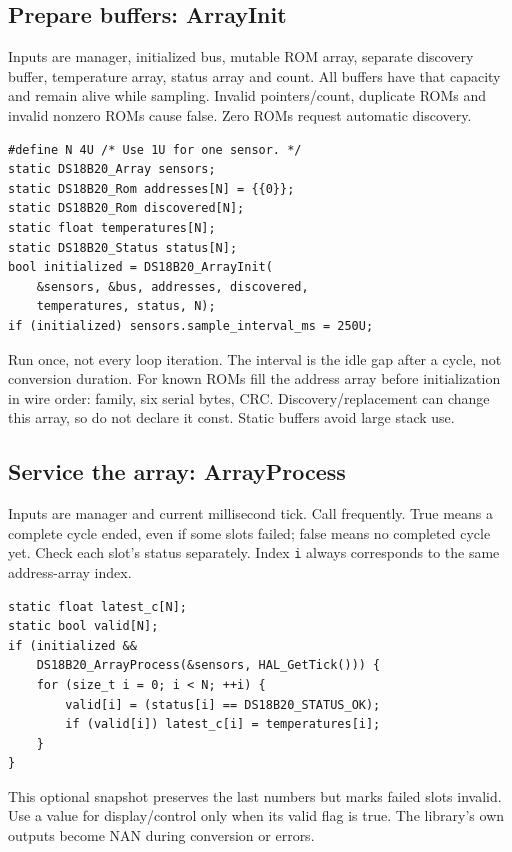 \subsection{Prepare buffers: ArrayInit}
Inputs are manager, initialized bus, mutable ROM array, separate discovery
buffer, temperature array, status array and count. All buffers have that capacity
and remain alive while sampling. Invalid pointers/count, duplicate ROMs and
invalid nonzero ROMs cause false. Zero ROMs request automatic discovery.
\begin{lstlisting}
#define N 4U /* Use 1U for one sensor. */
static DS18B20_Array sensors;
static DS18B20_Rom addresses[N] = {{0}};
static DS18B20_Rom discovered[N];
static float temperatures[N];
static DS18B20_Status status[N];
bool initialized = DS18B20_ArrayInit(
    &sensors, &bus, addresses, discovered,
    temperatures, status, N);
if (initialized) sensors.sample_interval_ms = 250U;
\end{lstlisting}
Run once, not every loop iteration. The interval is the idle gap after a cycle,
not conversion duration. For known ROMs fill the address array before initialization
in wire order: family, six serial bytes, CRC. Discovery/replacement can change
this array, so do not declare it const. Static buffers avoid large stack use.

\subsection{Service the array: ArrayProcess}
Inputs are manager and current millisecond tick. Call frequently. True means a
complete cycle ended, even if some slots failed; false means no completed cycle
yet. Check each slot's status separately. Index \texttt{i} always corresponds
to the same address-array index.
\begin{lstlisting}
static float latest_c[N];
static bool valid[N];
if (initialized &&
    DS18B20_ArrayProcess(&sensors, HAL_GetTick())) {
    for (size_t i = 0; i < N; ++i) {
        valid[i] = (status[i] == DS18B20_STATUS_OK);
        if (valid[i]) latest_c[i] = temperatures[i];
    }
}
\end{lstlisting}
This optional snapshot preserves the last numbers but marks failed slots invalid.
Use a value for display/control only when its valid flag is true. The library's
own outputs become NAN during conversion or errors.

